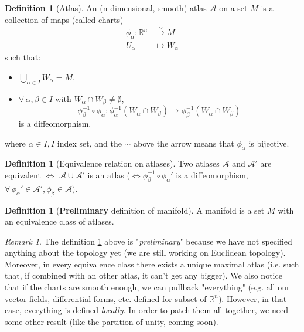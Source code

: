 \documentclass[a4paper,11pt,titlepage, article, oneside]{memoir}
\numberwithin{equation}{section}
\theoremstyle{definition}
\newtheorem{definition}[theorem]{Definition}
\theoremstyle{remark}
\newtheorem{remark}[theorem]{Remark}
\newcommand{\rfield}{\mathbb{R}}
\begin{document}
\begin{definition}[Atlas] \label{atlasdef}
  An (n-dimensional, smooth) atlas $\mathcal{A}$ on a set $M$ is a collection of maps (called charts)
  \begin{align}
    \phi_{\alpha} \colon \rfield^n &\overset{\sim}{\rightarrow} M \\
    U_{\alpha} &\mapsto W_{\alpha} \nonumber
  \end{align}
  such that:
  \begin{itemize}
    \item $\bigcup\limits_{\alpha \in I} W_{\alpha} = M$,
    \item $\forall\, \alpha, \beta \in I$ with $W_{\alpha} \cap W_{\beta} \not = \emptyset$,
    $$\phi^{-1}_{\beta} \circ \phi_{\alpha} \colon \phi^{-1}_{\alpha}(W_{\alpha} \cap W_{\beta}) \rightarrow \phi_{\beta}^{-1}(W_{\alpha} \cap W_{\beta})$$
    is a diffeomorphism.
  \end{itemize}
  where $\alpha \in I, I$ index set, and the $\sim$ above the arrow means that $\phi_{\alpha}$ is bijective.
\end{definition}

\begin{definition} [Equivalence relation on atlases]
  Two atlases $\mathcal{A}$ and $\mathcal{A'}$ are equivalent $\Leftrightarrow$ $\mathcal{A} \cup \mathcal{A'}$ is an atlas ($\Leftrightarrow \phi_{\beta}^{-1} \circ \phi_{\alpha}'$ is a diffeomorphism, $\forall\, \phi_{\alpha}' \in \mathcal{A}', \phi_{\beta} \in \mathcal{A})$.
\end{definition}

\begin{definition}[\textbf{Preliminary} definition of manifold] \label{manifoldprel}
  A manifold is a set $M$ with an equivalence class of atlases.
\end{definition}

\begin{remarkbox}\begin{remark}
  The definition \ref{manifoldprel} above is "\textit{preliminary}" because we have not specified anything about the topology yet (we are still working on Euclidean topology). Moreover, in every equivalence class there exists a unique maximal atlas (i.e. such that, if combined with an other atlas, it can't get any bigger). We also notice that if the charts are smooth enough, we can pullback "everything" (e.g. all our vector fields, differential forms, etc. defined for subset of $\rfield^n$). However, in that case, everything is defined \textit{locally}. In order to patch them all together, we need some other result (like the partition of unity, coming soon).
\end{remark}\end{remarkbox}
\end{document}
